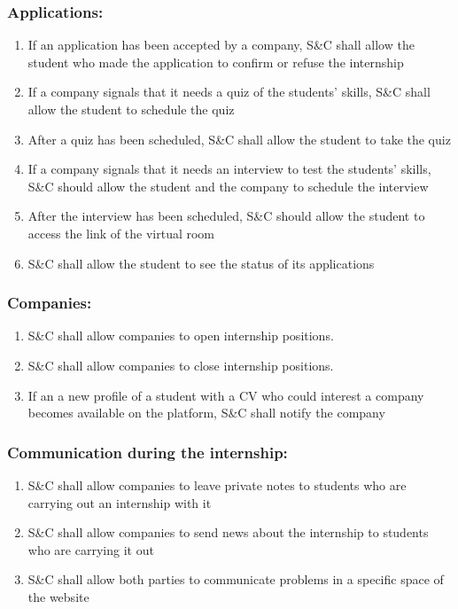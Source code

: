     \subsubsection*{Applications:}
        \begin{enumerate}[label=\textbf{R\arabic*},resume]
            \item If an application has been accepted by a company, S\&C shall allow the student who made the application to confirm or refuse the internship
            \item If a company signals that it needs a quiz of the students' skills, S\&C shall allow the student to schedule the quiz
            \item After a quiz has been scheduled, S\&C shall allow the student to take the quiz
            \item If a company signals that it needs an interview to test the students' skills, S\&C should allow the student and the company to schedule the interview
            \item After the interview has been scheduled, S\&C should allow the student to access the link of the virtual room
            \item S\&C shall allow the student to see the status of its applications
            
        \end{enumerate}
    
    \subsubsection*{Companies:}
        \begin{enumerate}[label=\textbf{R\arabic*},resume]
            \item S\&C shall allow companies to open internship positions.
            \item S\&C shall allow companies to close internship positions.
            \item If an a new profile of a student with a CV who could interest a company becomes available on the platform, S\&C shall notify the company
        \end{enumerate}
    
    \subsubsection*{Communication during the internship:}
         \begin{enumerate}[label=\textbf{R\arabic*},resume]
            \item S\&C shall allow companies to leave private notes to students who are carrying out an internship with it
            \item S\&C shall allow companies to send news about the internship to students who are carrying it out
            \item S\&C shall allow both parties to communicate problems in a specific space of the website
        \end{enumerate}
    
